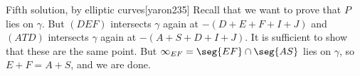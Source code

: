 \begin{customenv}{Fifth solution, by elliptic curves}[yaron235]
    Recall that we want to prove that $P$ lies on $\gamma$. But $(DEF)$ intersects $\gamma$ again at $-(D+E+F+I+J)$ and $(ATD)$ intersects $\gamma$ again at $-(A+S+D+I+J)$. It is sufficient to show that these are the same point. But $\infty_{EF}=\seg{EF}\cap\seg{AS}$ lies on $\gamma$, so $E+F=A+S$, and we are done.
\end{customenv}
